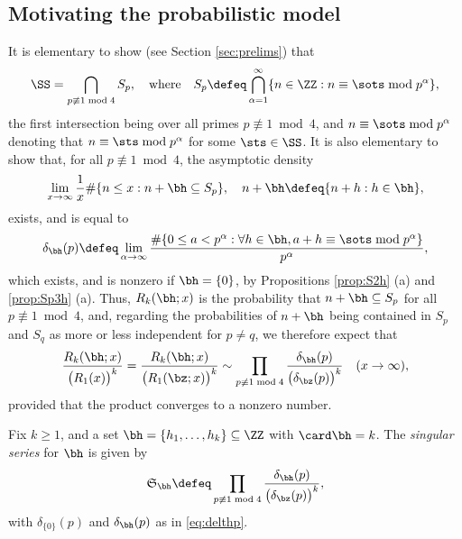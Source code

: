 \documentclass[12pt, reqno, twoside, letterpaper]{amsart}
\begin{document}
%
\begin{nixnix}
%
\section{Motivating the probabilistic model}
%
It is elementary to show (see Section \ref{sec:prelims}) that 
%
\begin{equation}
 \label{eq:defSp}
 \SS = \bigcap_{p \not\equiv 1 \bmod 4} S_p,
  \quad 
   \text{where}
    \quad  
 S_p 
  \defeq 
   \bigcap_{\alpha = 1}^{\infty}
    \{n \in \ZZ : n \equiv \sots \bmod p^{\alpha}\},
\end{equation}
the first intersection being over all primes  
$p \not\equiv 1 \bmod 4$, and $n \equiv \sots \bmod p^{\alpha}$ 
denoting that $n \equiv \sts \bmod p^{\alpha}$ for some 
$\sts \in \SS$. 
%
It is also elementary to show that, for all 
$p \not\equiv 1 \bmod 4$, the asymptotic density 
\[
 \lim_{x \to \infty}
  \frac{1}{x}
   \#\{n \le x : n + \bh \subseteq S_p\}, 
    \quad 
     n + \bh \defeq \{n + h : h \in \bh\},
\] 
exists, and is equal to 
\begin{equation}
  \delta_{\bh}(p)
   \defeq 
    \lim_{\alpha \to \infty}
     \frac{
      \#\{0 \le a < p^{\alpha} : 
             \forall h \in \bh, 
              a + h \equiv \sots \bmod p^{\alpha}\}
          }
          {p^{\alpha}},
\end{equation}
%
which exists, and is nonzero if $\bh = \{0\}$, by 
Propositions \ref{prop:S2h} (a) and \ref{prop:Sp3h} (a).
%
Thus, $R_k(\bh;x)$ is the probability that 
$n + \bh \subseteq S_p$ for all $p \not\equiv 1 \bmod 4$, and, 
regarding the probabilities of $n + \bh$ being contained in $S_p$ 
and $S_q$ as more or less independent for $p \ne q$, we therefore 
expect that 
\[
 \frac{R_k(\bh;x)}{\big(R_1(x)\big)^k}
  =
  \frac{R_k(\bh;x)}{\big(R_1(\bz;x)\big)^k}
   \sim 
    \prod_{p \not\equiv 1 \bmod 4}
     \frac{\delta_{\bh}(p)}{\big(\delta_{\bz}(p)\big)^k}
      \quad 
       (x \to \infty),
\]
provided that the product converges to a nonzero number.

\begin{definition}
 \label{def:Sss}
Fix $k \ge 1$, and a set 
$\bh = \{h_1,\ldots,h_k\} \subseteq \ZZ$ with $\card \bh = k$.
%
The {\em singular series} for $\bh$ is given by  
\begin{equation}
 \label{eq:defsssP}
  \mathfrak{S}_{\bh}
   \defeq 
    \prod_{p \not\equiv 1 \bmod 4}
     \frac{\delta_{\bh}(p)}{\big(\delta_{\bz}(p)\big)^k},
\end{equation}
with $\delta_{\{0\}}(p)$ and $\delta_{\bh}(p)$ as in 
\eqref{eq:delthp}.
\end{definition}


\end{nixnix}
\end{document}

